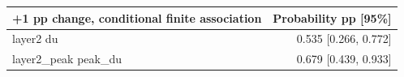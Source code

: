 \begingroup\small\setlength{\tabcolsep}{3pt}
\begin{tabularx}{\linewidth}{Xr}\toprule
+1 pp change, conditional finite association & Probability pp [95\%] \\ \midrule
layer2 du & 0.535 [0.266, 0.772] \\
layer2\_peak peak\_du & 0.679 [0.439, 0.933] \\
\bottomrule\end{tabularx}\endgroup
